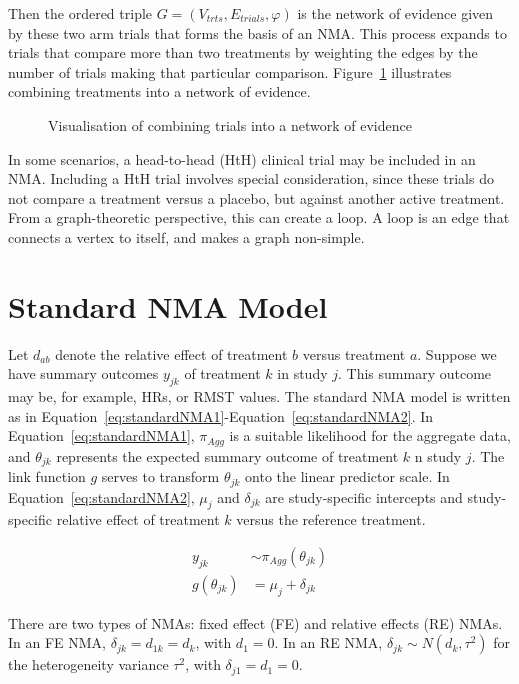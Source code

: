 Then the ordered triple $G = (V_{trts}, E_{trials}, \varphi)$ is the network of evidence given by these two arm trials that forms the basis of an NMA. This process expands to trials that compare more than two treatments by weighting the edges by the number of trials making that particular comparison. Figure~\ref{fig:comb_evi} illustrates combining treatments into a network of evidence.

\begin{figure}[h]
    \centering
    
    \caption{Visualisation of combining trials into a network of evidence}
    \label{fig:comb_evi}
\end{figure}

In some scenarios, a head-to-head (HtH) clinical trial may be included in an NMA. Including a HtH trial involves special consideration, since these trials do not compare a treatment versus a placebo, but against another active treatment. From a graph-theoretic perspective, this can create a loop. A loop is an edge that connects a vertex to itself, and makes a graph non-simple.

\section{Standard NMA Model}
Let $d_{ab}$ denote the relative effect of treatment $b$ versus treatment $a$. Suppose we have summary outcomes $y_{jk}$ of treatment $k$ in study $j$. This summary outcome may be, for example, HRs, or RMST values. The standard NMA model is written as in Equation~\ref{eq:standardNMA1}-Equation~\ref{eq:standardNMA2}. In Equation~\ref{eq:standardNMA1}, $\pi_{Agg}$ is a suitable likelihood for the aggregate data, and $\theta_{jk}$ represents the expected summary outcome of treatment $k$ 
n study $j$. The link function $g$ serves to transform $\theta_{jk}$ onto the linear predictor scale. In Equation~\ref{eq:standardNMA2}, $\mu_j$ and $\delta_{jk}$ are study-specific intercepts and study-specific relative effect of treatment $k$ versus the reference treatment.

\begin{align}
    y_{jk} &\sim \pi_{Agg}(\theta_{jk}) \label{eq:standardNMA1} \\
    g(\theta_{jk}) &= \mu_j + \delta_{jk} \label{eq:standardNMA2}
\end{align}

There are two types of NMAs: fixed effect (FE) and relative effects (RE) NMAs. In an FE NMA, $\delta_{jk} = d_{1k} = d_k$, with $d_1 = 0$. In an RE NMA, $\delta_{jk} \sim N(d_k, \tau^2)$ for the heterogeneity variance $\tau^2$, with $\delta_{j1} = d_1 = 0$. \\


